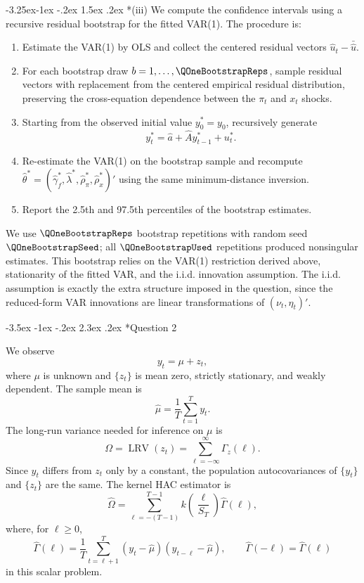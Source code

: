 \documentclass[11pt]{article}
\makeatletter
\renewcommand\section{\@startsection{section}{1}{\z@}%
  {-3.5ex \@plus -1ex \@minus -.2ex}%
  {2.3ex \@plus .2ex}%
  {\normalfont\Large}}
\renewcommand\subsection{\@startsection{subsection}{2}{\z@}%
  {-3.25ex\@plus -1ex \@minus -.2ex}%
  {1.5ex \@plus .2ex}%
  {\normalfont\large}}
\makeatother
\begin{document}
\subsection*{(iii)}
We compute the confidence intervals using a recursive residual bootstrap for the fitted
VAR(1). The procedure is:

\begin{enumerate}
\item Estimate the VAR(1) by OLS and collect the centered residual vectors
\(\hat u_t-\bar{\hat u}\).
\item For each bootstrap draw \(b=1,\ldots,\QOneBootstrapReps\), sample residual vectors
with replacement from the centered empirical residual distribution, preserving the
cross-equation dependence between the \(\pi_t\) and \(x_t\) shocks.
\item Starting from the observed initial value \(y_0^*=y_0\), recursively generate
\[
y_t^*=\hat a+\widehat A y_{t-1}^*+u_t^*.
\]
\item Re-estimate the VAR(1) on the bootstrap sample and recompute
\(\widehat\theta^*=(\widehat\gamma_f^*,\widehat\lambda^*,
\widehat\rho_\pi^*,\widehat\rho_x^*)'\) using the same minimum-distance inversion.
\item Report the 2.5th and 97.5th percentiles of the bootstrap estimates.
\end{enumerate}

We use \(\QOneBootstrapReps\) bootstrap repetitions with random seed \(\QOneBootstrapSeed\);
all \(\QOneBootstrapUsed\) repetitions produced nonsingular estimates. This bootstrap relies
on the VAR(1) restriction derived above, stationarity of the fitted VAR, and the i.i.d.
innovation assumption. The i.i.d. assumption is exactly the extra structure imposed in the
question, since the reduced-form VAR innovations are linear transformations of
\((\nu_t,\eta_t)'\).

\section*{Question 2}

We observe
\[
y_t=\mu+z_t,
\]
where \(\mu\) is unknown and \(\{z_t\}\) is mean zero, strictly stationary, and weakly
dependent. The sample mean is
\[
\widehat\mu=\frac{1}{T}\sum_{t=1}^T y_t.
\]
The long-run variance needed for inference on \(\mu\) is
\[
\Omega=\operatorname{LRV}(z_t)=\sum_{\ell=-\infty}^{\infty}\Gamma_z(\ell).
\]
Since \(y_t\) differs from \(z_t\) only by a constant, the population autocovariances of
\(\{y_t\}\) and \(\{z_t\}\) are the same. The kernel HAC estimator is
\[
\widehat\Omega
=
\sum_{\ell=-(T-1)}^{T-1}
k\!\left(\frac{\ell}{S_T}\right)\widehat\Gamma(\ell),
\]
where, for \(\ell\geq 0\),
\[
\widehat\Gamma(\ell)
=
\frac{1}{T}\sum_{t=\ell+1}^T
(y_t-\widehat\mu)(y_{t-\ell}-\widehat\mu),
\qquad
\widehat\Gamma(-\ell)=\widehat\Gamma(\ell)
\]
in this scalar problem.
\end{document}
